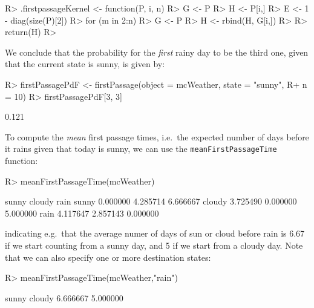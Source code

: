 \documentclass[
  nojss]{jss}
\begin{document}
\begin{CodeChunk}

\begin{CodeInput}
R> .firstpassageKernel <- function(P, i, n){
R>   G <- P
R>   H <- P[i,]
R>   E <- 1 - diag(size(P)[2])
R>   for (m in 2:n) {
R>     G <- P %
R>     H <- rbind(H, G[i,])
R>   }
R>   return(H)
R> }
\end{CodeInput}
\end{CodeChunk}

We conclude that the probability for the \emph{first} rainy day to be the third one, given that the current state is sunny, is given by:

\begin{CodeChunk}

\begin{CodeInput}
R> firstPassagePdF <- firstPassage(object = mcWeather, state = "sunny", 
R+                                 n = 10)
R> firstPassagePdF[3, 3]
\end{CodeInput}

\begin{CodeOutput}
[1] 0.121
\end{CodeOutput}
\end{CodeChunk}

To compute the \emph{mean} first passage times, i.e.~the expected number of days before it rains
given that today is sunny, we can use the \texttt{meanFirstPassageTime} function:

\begin{CodeChunk}

\begin{CodeInput}
R> meanFirstPassageTime(mcWeather)
\end{CodeInput}

\begin{CodeOutput}
          sunny   cloudy     rain
sunny  0.000000 4.285714 6.666667
cloudy 3.725490 0.000000 5.000000
rain   4.117647 2.857143 0.000000
\end{CodeOutput}
\end{CodeChunk}

indicating e.g.~that the average numer of days of sun or cloud before rain is 6.67 if we start
counting from a sunny day, and 5 if we start from a cloudy day. Note that
we can also specify one or more destination states:

\begin{CodeChunk}

\begin{CodeInput}
R> meanFirstPassageTime(mcWeather,"rain")
\end{CodeInput}

\begin{CodeOutput}
   sunny   cloudy 
6.666667 5.000000 
\end{CodeOutput}
\end{CodeChunk}
\end{document}
